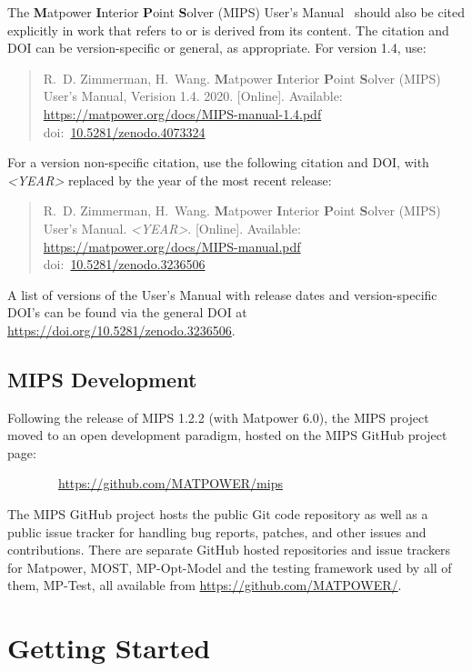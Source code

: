 \documentclass[12pt]{article}
\newcommand{\matpower}[0]{{\sc Matpower}}
\newcommand{\mptest}[0]{{MP-Test}}
\newcommand{\mips}[0]{{MIPS}}
\newcommand{\mipsurl}[0]{https://github.com/MATPOWER/mips}
\newcommand{\mipsname}[0]{{{\bf M}{\sc atpower} \textbf{I}nterior \textbf{P}oint \textbf{S}olver}}
\newcommand{\mpom}[0]{\mbox{MP-Opt-Model}}
\newcommand{\most}[0]{{MOST}}
\newcommand{\doi}[1]{doi:~\href{https://doi.org/#1}{#1}}
\numberwithin{equation}{section}
\numberwithin{table}{section}
\numberwithin{figure}{section}
\begin{document}
The \mipsname{} (\mips{}) User's Manual~\cite{mips_manual} should also be cited explicitly
in work that refers to or is derived from its content. The citation and
DOI can be version-specific or general, as appropriate. For version 1.4,
use:

\begin{quote}
\footnotesize
R.~D. Zimmerman, H.~Wang. \mipsname{} (\mips{}) User's Manual, Verision 1.4. 2020. [Online]. Available: \url{https://matpower.org/docs/MIPS-manual-1.4.pdf}\\
\doi{10.5281/zenodo.4073324}
\end{quote}
For a version non-specific citation, use the following citation and DOI,
with \emph{\textless{}YEAR\textgreater{}} replaced by the year of the most recent release:

\begin{quote}
\footnotesize
R.~D. Zimmerman, H.~Wang. \mipsname{} (\mips{}) User's Manual. \emph{\textless{}YEAR\textgreater{}}.
[Online]. Available: \url{https://matpower.org/docs/MIPS-manual.pdf}\\
\doi{10.5281/zenodo.3236506}
\end{quote}
A list of versions of the User's Manual with release dates and
version-specific DOI's can be found via the general DOI at
\url{https://doi.org/10.5281/zenodo.3236506}.

\subsection{\mips{} Development}
\label{sec:development}

Following the release of \mips{} 1.2.2 (with \matpower{} 6.0), the \mips{} project moved to an open development paradigm, hosted on the \mips{} GitHub project page:

\bigskip

~~~~~~~~\url{\mipsurl}

\bigskip

The \mips{} GitHub project hosts the public Git code repository as well as a public issue tracker for handling bug reports, patches, and other issues and contributions. There are separate GitHub hosted repositories and issue trackers for \matpower{}, \most{}, \mpom{} and the testing framework used by all of them, \mptest{}, all available from \url{https://github.com/MATPOWER/}.


\section{Getting Started}
\end{document}
